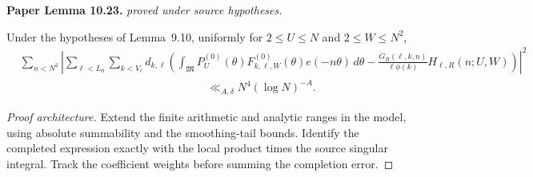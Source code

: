 \begin{lemma}
\label{goldbach_major_completion}
\leanok
\par\medskip\noindent\textbf{Paper Lemma 10.23.} \textit{proved under source hypotheses.}\par
Under the hypotheses of Lemma~\textup{9.10}, uniformly for
\(2\leq U\leq N\) and \(2\leq W\leq N^2\),
\begin{align}
& \sum_{n<N^2}\left|
 \sum_{\ell<L_0}\sum_{k<V_\ell}d_{k,\ell}
 \left(
 \int_{\mathfrak M}
 P_U^{(0)}(\theta)F_{k,\ell,W}^{(0)}(\theta)e(-n\theta)\,d\theta
 -
 \frac{G_R(\ell,k,n)}{\ell\phi(k)}
 H_{\ell,R}(n;U,W)
 \right)\right|^2\\
&\hspace{7cm} \ll_{A,\delta}N^4(\log N)^{-A}.
\end{align}
\end{lemma}
\begin{proof}[Proof architecture]
\leanok
Extend the finite arithmetic and analytic ranges in the model, using absolute summability and the smoothing-tail bounds. Identify the completed expression exactly with the local product times the source singular integral. Track the coefficient weights before summing the completion error.
\end{proof}

